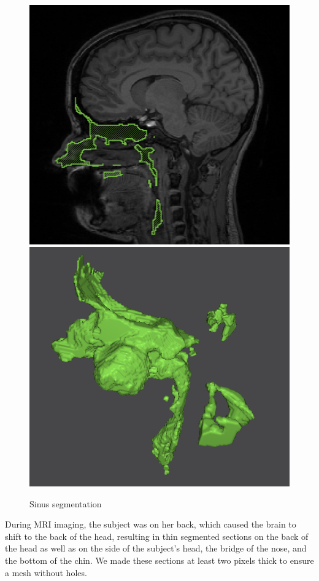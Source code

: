 \begin{figure}[H]
\begin{center}
\includegraphics[width=.49\textwidth]{Figures/sinus_sag}
\includegraphics[width=.49\textwidth]{Figures/sinus_iso}
\caption{Sinus segmentation}
\label{fig:sinus}
\end{center}
\end{figure}

During MRI imaging, the subject was on her back, which caused the brain to shift to the back of the head, resulting in thin segmented sections on the back of the head as well as on the side of the subject's head, the bridge of the nose, and the bottom of the chin. We made these sections at least two pixels thick to ensure a mesh without holes.

